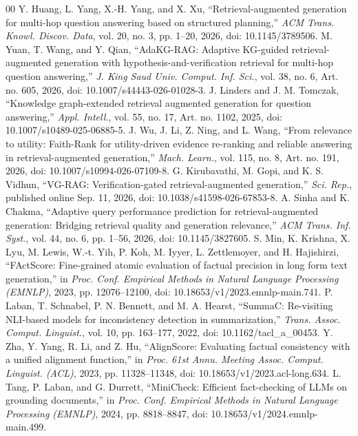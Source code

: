 \documentclass[conference]{IEEEtran}
\begin{document}
\begin{thebibliography}{00}
 Y. Huang, L. Yang, X.-H. Yang, and X. Xu, ``Retrieval-augmented generation for multi-hop question answering based on structured planning,'' \textit{ACM Trans. Knowl. Discov. Data}, vol. 20, no. 3, pp. 1--20, 2026, doi: 10.1145/3789506.
 M. Yuan, T. Wang, and Y. Qian, ``AdaKG-RAG: Adaptive KG-guided retrieval-augmented generation with hypothesis-and-verification retrieval for multi-hop question answering,'' \textit{J. King Saud Univ. Comput. Inf. Sci.}, vol. 38, no. 6, Art. no. 605, 2026, doi: 10.1007/s44443-026-01028-3.
 J. Linders and J. M. Tomczak, ``Knowledge graph-extended retrieval augmented generation for question answering,'' \textit{Appl. Intell.}, vol. 55, no. 17, Art. no. 1102, 2025, doi: 10.1007/s10489-025-06885-5.
 J. Wu, J. Li, Z. Ning, and L. Wang, ``From relevance to utility: Faith-Rank for utility-driven evidence re-ranking and reliable answering in retrieval-augmented generation,'' \textit{Mach. Learn.}, vol. 115, no. 8, Art. no. 191, 2026, doi: 10.1007/s10994-026-07109-8.
 G. Kirubavathi, M. Gopi, and K. S. Vidhun, ``VG-RAG: Verification-gated retrieval-augmented generation,'' \textit{Sci. Rep.}, published online Sep. 11, 2026, doi: 10.1038/s41598-026-67853-8.
 A. Sinha and K. Chakma, ``Adaptive query performance prediction for retrieval-augmented generation: Bridging retrieval quality and generation relevance,'' \textit{ACM Trans. Inf. Syst.}, vol. 44, no. 6, pp. 1--56, 2026, doi: 10.1145/3827605.
 S. Min, K. Krishna, X. Lyu, M. Lewis, W.-t. Yih, P. Koh, M. Iyyer, L. Zettlemoyer, and H. Hajishirzi, ``FActScore: Fine-grained atomic evaluation of factual precision in long form text generation,'' in \textit{Proc. Conf. Empirical Methods in Natural Language Processing (EMNLP)}, 2023, pp. 12076--12100, doi: 10.18653/v1/2023.emnlp-main.741.
 P. Laban, T. Schnabel, P. N. Bennett, and M. A. Hearst, ``SummaC: Re-visiting NLI-based models for inconsistency detection in summarization,'' \textit{Trans. Assoc. Comput. Linguist.}, vol. 10, pp. 163--177, 2022, doi: 10.1162/tacl\_a\_00453.
 Y. Zha, Y. Yang, R. Li, and Z. Hu, ``AlignScore: Evaluating factual consistency with a unified alignment function,'' in \textit{Proc. 61st Annu. Meeting Assoc. Comput. Linguist. (ACL)}, 2023, pp. 11328--11348, doi: 10.18653/v1/2023.acl-long.634.
 L. Tang, P. Laban, and G. Durrett, ``MiniCheck: Efficient fact-checking of LLMs on grounding documents,'' in \textit{Proc. Conf. Empirical Methods in Natural Language Processing (EMNLP)}, 2024, pp. 8818--8847, doi: 10.18653/v1/2024.emnlp-main.499.

\end{thebibliography}
\end{document}
